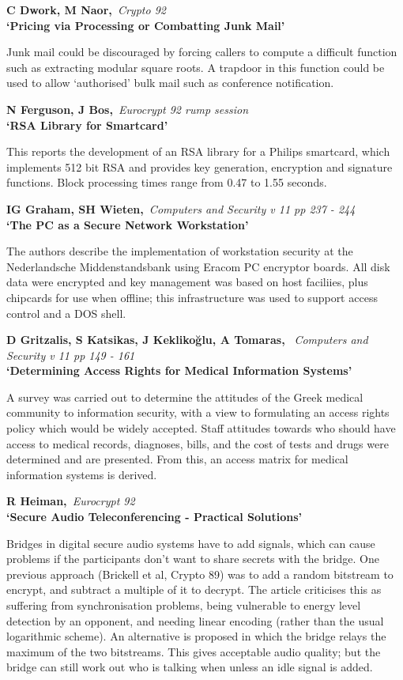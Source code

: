 {\bf \noindent C Dwork, M Naor,}{\em ~Crypto 92\\}
{\bf `Pricing via Processing or Combatting Junk Mail'}

Junk mail could be discouraged by forcing callers to compute a difficult 
function such as extracting modular square roots. A trapdoor in this 
function could be used to allow `authorised' bulk mail such as conference 
notification.

{\bf \noindent N Ferguson, J Bos,}{\em ~Eurocrypt 92 rump session\\}
{\bf `RSA Library for Smartcard'}

This reports the development of an RSA library for a Philips smartcard,
which implements 512 bit RSA and provides key generation, encryption and
signature functions. Block processing times range from 0.47 to 1.55 seconds.

{\bf \noindent IG Graham, SH Wieten,}{\em ~Computers and Security v 11 pp 
237 - 244\\}
{\bf `The PC as a Secure Network Workstation'}

The authors describe the implementation of workstation security at the
Nederlandsche Middenstandsbank using Eracom PC encryptor boards. All disk 
data were encrypted and key management was based on host faciliies, plus 
chipcards for use when offline; this infrastructure was used to support
access control and a DOS shell.

{\bf \noindent D Gritzalis, S Katsikas, J Kekliko\u{g}lu, A Tomaras,}
{\em ~Computers and Security v 11 pp 149 - 161\\}
{\bf `Determining Access Rights for Medical Information Systems'}

A survey was carried out to determine the attitudes of the Greek medical
community to information security, with a view to formulating an access
rights policy which would be widely accepted. Staff attitudes towards who
should have access to medical records, diagnoses, bills, and the cost of
tests and drugs were determined and are presented. From this, an access 
matrix for medical information systems is derived.

{\bf \noindent R Heiman,}{\em ~Eurocrypt 92\\}
{\bf `Secure Audio Teleconferencing - Practical Solutions'}

Bridges in digital secure audio systems have to add signals, which can
cause problems if the participants don't want to share secrets with the
bridge. One previous approach (Brickell et al, Crypto 89) was to
add a random bitstream to encrypt, and subtract a multiple of it to
decrypt. The article criticises this as suffering from synchronisation
problems, being vulnerable to energy level detection by an opponent, and 
needing linear encoding (rather than the usual logarithmic scheme). An 
alternative is proposed in which the bridge relays the maximum of the two
bitstreams. This gives acceptable audio quality; but the bridge can still 
work out who is talking when unless an idle signal is added.

